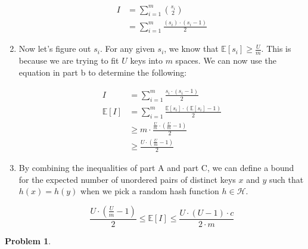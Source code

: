 \documentclass[11pt]{article}
\theoremstyle{definition}
\theoremstyle{case}
\theoremstyle{theorem}
\newtheorem{prob}{Problem}
\begin{document}
\begin{enumerate}[label=(\alph*)]
\begin{align*}
  I &= \sum_{i = 1}^{m}\binom{s_i}{2} \\
    &= \sum_{i = 1}^{m}\frac{(s_i) \cdot (s_i - 1)}{2}
\end{align*}

\item Now let's figure out $s_i$. For any given $s_i$, we know that $\mathbb{E}[s_i] \geq \frac{U}{m}$. This is because
we are trying to fit $U$ keys into $m$ spaces. We can now use the equation in part b to determine the following:

\begin{align*}
            I &= \sum_{i = 1}^{m}\frac{s_i \cdot (s_i - 1)}{2} \\
\mathbb{E}[I] &= \sum_{i = 1}^{m}\frac{\mathbb{E}[s_i] \cdot (\mathbb{E}[s_i] - 1)}{2} \\
              &\geq m \cdot \frac{\frac{U}{m} \cdot (\frac{U}{m} - 1)}{2} \\
              &\geq \frac{U \cdot (\frac{U}{m} - 1)}{2} 
\end{align*}

\item By combining the inequalities of part A and part C, we can define a bound for the expected number of
unordered pairs of distinct keys $x$ and $y$ such that $h(x) = h(y)$ when we pick a random hash function $h \in \mathcal{H}$.

\[
  \frac{U \cdot (\frac{U}{m} - 1)}{2} \leq \mathbb{E}[I] \leq \frac{U \cdot (U - 1) \cdot c}{2 \cdot m}
\]

\end{enumerate}

\begin{prob}\end{prob}
\end{document}
